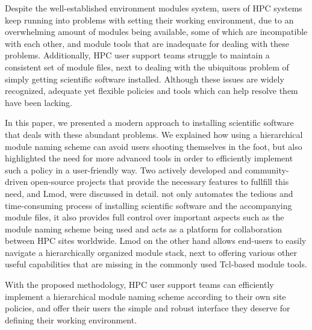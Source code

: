 Despite the well-established environment modules system, users of HPC systems keep
running into problems with setting their working environment, due to an overwhelming
amount of modules being available, some of which are incompatible with each other, and
module tools that are inadequate for dealing with these problems. Additionally, HPC
user support teams struggle to maintain a consistent set of module files, next to
dealing with the ubiquitous problem of simply getting scientific software installed.
Although these issues are widely recognized, adequate yet flexible policies and tools
which can help resolve them have been lacking.

In this paper, we presented a modern approach to installing scientific software that
deals with these abundant problems. We explained how using a hierarchical module naming
scheme can avoid users shooting themselves in the foot, but also highlighted the need
for more advanced tools in order to efficiently implement such a policy in a
user-friendly way. Two actively developed and community-driven open-source projects
that provide the necessary features to fullfill this need, \easybuild{} and Lmod, were
discussed in detail. \easybuild{} not only automates the tedious and time-consuming
process of installing scientific software and the accompanying module files, it also
provides full control over important aspects such as the module naming scheme being
used and acts as a platform for collaboration between HPC sites worldwide. Lmod on the
other hand allows end-users to easily navigate a hierarchically organized module
stack, next to offering various other useful capabilities that are missing in the
commonly used Tcl-based module tools.

With the proposed methodology, HPC user support teams can efficiently implement a
hierarchical module naming scheme according to their own site policies, and offer
their users the simple and robust interface they deserve for defining their working
environment.
